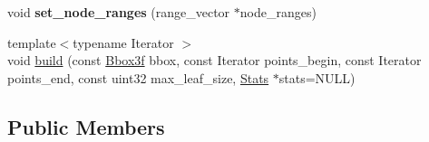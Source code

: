 \begin{DoxyCompactItemize}
\mbox{\label{structcugar_1_1cuda_1_1_l_b_v_h__builder_af0af9e90fb42ee2979cb11ec22542e1e}} 
void {\bfseries set\+\_\+node\+\_\+ranges} (range\+\_\+vector $\ast$node\+\_\+ranges)
\item 
{\footnotesize template$<$typename Iterator $>$ }\\void \hyperlink{structcugar_1_1cuda_1_1_l_b_v_h__builder_ab39b2be673c43e12283c25800f22d5b1}{build} (const \hyperlink{structcugar_1_1_bbox}{Bbox3f} bbox, const Iterator points\+\_\+begin, const Iterator points\+\_\+end, const uint32 max\+\_\+leaf\+\_\+size, \hyperlink{structcugar_1_1cuda_1_1_l_b_v_h__builder__stats}{Stats} $\ast$stats=N\+U\+LL)
\end{DoxyCompactItemize}
\subsection*{Public Members}
